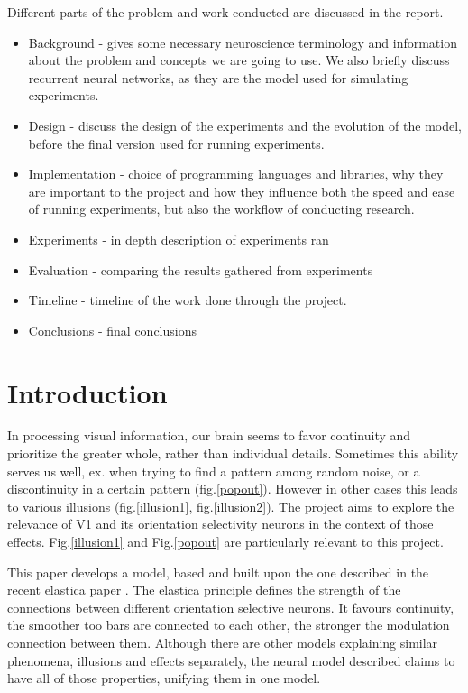 Different parts of the problem and work conducted are discussed in the report.
\begin{itemize}
  \item Background - gives some necessary neuroscience terminology and information about the problem and concepts we are going to use. We also briefly discuss recurrent neural networks, as they are the model used for simulating experiments.
  \item Design - discuss the design of the experiments and the evolution of the model, before the final version used for running experiments.
  \item Implementation - choice of programming languages and libraries, why they are important to the project and how they influence both the speed and ease of running experiments, but also the workflow of conducting research.
  \item Experiments - in depth description of experiments ran
  \item Evaluation - comparing the results gathered from experiments
  \item Timeline - timeline of the work done through the project.
  \item Conclusions - final conclusions
\end{itemize}


\chapter{Introduction}

In processing visual information, our brain seems to favor continuity and prioritize the greater whole, rather than individual details. Sometimes this ability serves us well, ex. when trying to find a pattern among random noise, or a discontinuity in a certain pattern (fig.\ref{popout}). However in other cases this leads to various illusions (fig.\ref{illusion1}, fig.\ref{illusion2}). The project aims to explore the relevance of V1 and its orientation selectivity neurons in the context of those effects. Fig.\ref{illusion1} and Fig.\ref{popout} are particularly relevant to this project.

This paper develops a model, based and built upon the one described in the recent elastica paper \cite{keemink2015unified}. The elastica principle defines the strength of the connections between different orientation selective neurons. It favours continuity, the smoother too bars are connected to each other, the stronger the modulation connection between them. Although there are other models explaining similar phenomena, illusions and effects separately, the neural model described claims to have all of those properties, unifying them in one model. 








